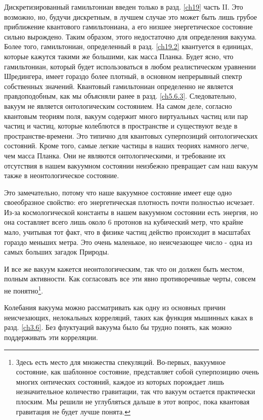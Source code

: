 \documentclass[main.tex]{subfiles}
\begin{document}
Дискретизированный гамильтониан введен только в разд. \ref{ch19} часть II. Это возможно, но, будучи дискретным, в лучшем случае это может быть лишь грубое приближение квантового гамильтониана, а его низшее энергетическое состояние сильно вырождено. Таким образом, этого недостаточно для определения вакуума. Более того, гамильтониан, определенный в разд. \ref{ch19.2} квантуется в единицах, которые кажутся такими же большими, как масса Планка. Будет ясно, что гамильтониан, который будет использоваться в любом реалистическом уравнении Шредингера, имеет гораздо более плотный, в основном непрерывный спектр собственных значений. Квантовый гамильтониан определенно не является правдоподобным, как мы объясняли ранее в разд. \ref{ch5.6.3}. Следовательно, вакуум не является онтологическим состоянием.
На самом деле, согласно квантовым теориям поля, вакуум содержит много виртуальных частиц или пар частиц и частиц, которые колеблются в пространстве и существуют везде в пространстве-времени. Это типично для квантовых суперпозиций онтологических состояний. Кроме того, самые легкие частицы в наших теориях намного легче, чем масса Планка. Они не являются онтологическими, и требование их отсутствия в нашем вакуумном состоянии неизбежно превращает сам наш вакуум также в неонтологическое состояние.

Это замечательно, потому что наше вакуумное состояние имеет еще одно своеобразное свойство: его энергетическая плотность почти полностью исчезает. Из-за космологической константы в нашем вакуумном состоянии есть энергия, но она составляет всего лишь около 6 протонов на кубический метр, что крайне мало, учитывая тот факт, что в  физике частиц действо происходит в масштабах гораздо меньших метра. Это очень маленькое, но неисчезающее число - одна из самых больших загадок Природы.

И все же вакуум кажется неонтологическим, так что он должен быть местом, полным активности. Как согласовать все эти явно противоречивые черты, совсем не понятно\footnote{Здесь есть место для множества спекуляций. Во-первых, вакуумное состояние, как шаблонное состояние, представляет собой суперпозицию очень многих онтических состояний, каждое из которых порождает лишь незначительное количество гравитации, так что вакуум остается практически плоским. Мы решили не углубляться дальше в этот вопрос, пока квантовая гравитация не будет лучше понята.}.

Колебания вакуума можно рассматривать как одну из основных причин неисчезающих, нелокальных корреляций, таких как функция мышинных каках в разд. \ref{ch3.6}. Без флуктуаций вакуума было бы трудно понять, как можно поддерживать эти корреляции.
\end{document}
